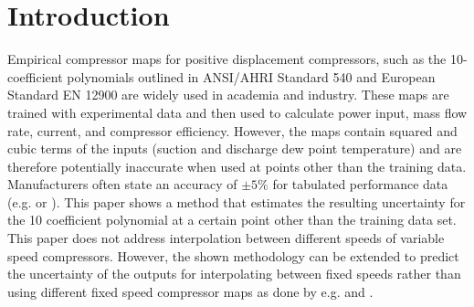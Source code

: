 \section{Introduction}
\label{sec:introduction}
Empirical compressor maps for positive displacement compressors, such as the 10-coefficient polynomials outlined in ANSI/AHRI Standard 540 \cite{AHRI:540} and European Standard EN 12900 \cite{CEN:2013}  are widely used in academia and industry.  These maps are trained with experimental data and then used to calculate power input, mass flow rate, current, and compressor efficiency.  However, the maps contain squared and cubic terms of the inputs (suction and discharge dew point temperature) and are therefore potentially inaccurate when used at points other than the training data. Manufacturers often state an accuracy of $\pm 5 \%$ for tabulated performance data (e.g. \cite{emerson:2006} or \cite{bristol:2015}).
This paper shows a method that estimates the resulting uncertainty for the 10 coefficient polynomial at a certain point other than the training data set. \\
This paper does not address interpolation between different speeds of variable speed compressors. However, the shown methodology can be extended to predict the uncertainty of the outputs for interpolating between fixed speeds rather than using different fixed speed compressor maps as done by e.g.  \cite{shen:2014} and \cite{caskey:2012}.